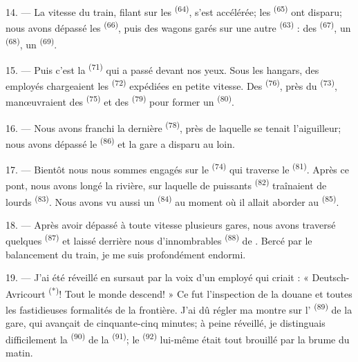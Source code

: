 14. --- La vitesse du train, filant sur les  \textsuperscript{(64)},
s'est accélérée; les  \textsuperscript{(65)} ont disparu; nous
avons dépassé les  \textsuperscript{(66)}, puis des wagons
garés sur une autre  \textsuperscript{(63)} : des
 \textsuperscript{(67)}, un 
\textsuperscript{(68)}, un  \textsuperscript{(69)}.


15. --- Puis c'est la  \textsuperscript{(71)} qui
a passé devant nos yeux. Sous les hangars, des employés chargeaient les
 \textsuperscript{(72)} expédiées en petite vitesse. Des
 \textsuperscript{(76)}, près du 
\textsuperscript{(73)}, manœuvraient des 
\textsuperscript{(75)} et des 
\textsuperscript{(79)} pour former un 
\textsuperscript{(80)}.

16. --- Nous avons franchi la dernière  \textsuperscript{(78)},
près de laquelle se tenait l'aiguilleur; nous avons dépassé le 
\textsuperscript{(86)} et la gare a disparu au loin.

17. --- Bientôt nous nous sommes engagés sur le 
\textsuperscript{(74)} qui traverse le  \textsuperscript{(81)}.
Après ce pont, nous avons longé la rivière, sur laquelle de puissants
 \textsuperscript{(82)} traînaient de lourds
 \textsuperscript{(83)}. Nous avons vu aussi un  \textsuperscript{(84)} au moment où il allait aborder au
 \textsuperscript{(85)}.

18. --- Après avoir dépassé à toute vitesse plusieurs gares, nous avons traversé
quelques  \textsuperscript{(87)} et laissé derrière nous
d'innombrables  \textsuperscript{(88)} de
. Bercé par le balancement du train, je me suis
profondément endormi.

\VUsaut{3.0mm}
\VUsaut{3.0mm}

19. --- J'ai été réveillé en sursaut par la voix d'un employé qui criait :
« Deutsch-Avricourt \textsuperscript{(*)}! Tout le monde descend! » Ce fut
l'inspection de la douane et toutes les fastidieuses formalités de la frontière.
J'ai dû régler ma montre sur l' \textsuperscript{(89)} de la
gare, qui avançait de cinquante-cinq minutes; à peine réveillé, je distinguais
difficilement la  \textsuperscript{(90)} de la
 \textsuperscript{(91)}; le 
\textsuperscript{(92)} lui-même était tout brouillé par la brume du matin.

